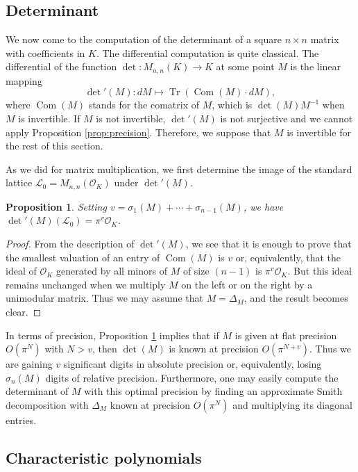 \documentclass{sig-alternate}
\DeclareMathOperator{\tr}{Tr}
\DeclareMathOperator{\com}{Com}
\newtheorem{prop}[theo]{Proposition}
\renewcommand{\O}{\mathcal O}
\newcommand{\detp}{\det{'}}
\begin{document}
\subsection{Determinant}

We now come to the computation of the determinant of a square $n 
\times n$ matrix with coefficients in $K$. The differential computation is 
quite classical.  The differential of the function $\det : M_{n,n}(K) \to 
K$ at some point $M$ is the linear mapping
$$\detp(M) : dM \mapsto \tr(\com(M) \cdot dM),$$
where $\com(M)$ stands for the comatrix of $M$, which is $\det(M) M^{-1}$ when $M$ is invertible. If $M$ is not 
invertible, $\detp(M)$ is not surjective and we cannot apply Proposition 
\ref{prop:precision}. Therefore, we suppose that $M$ is invertible for the rest of this section.

As we did for matrix multiplication, we first determine the image of
the standard lattice $\mathcal L_0 = M_{n,n}(\O_K)$ under $\detp(M)$.

\begin{prop}
\label{prop:detmatrix}
Setting $v = \sigma_1(M) + \cdots + \sigma_{n-1}(M)$, we have
$\detp(M)(\mathcal L_0) = \pi^v \O_K$.
\end{prop}

\begin{proof}
From the description of $\detp(M)$, we see that it is enough to prove 
that the smallest valuation of an entry of $\com(M)$ is $v$
or, equivalently, that the ideal of $\O_K$ generated by all 
minors of $M$ of size $(n-1)$ is $\pi^v
\O_K$. But this ideal remains unchanged when we multiply $M$ 
on the left or on the right by a unimodular matrix. Thus we may 
assume that $M = \Delta_M$, and the result becomes clear.
\end{proof}

In terms of precision, Proposition \ref{prop:detmatrix} implies that if 
$M$ is given at flat precision $O(\pi^N)$ with $N > v$, then $\det(M)$ 
is known at precision $O(\pi^{N+v})$.  Thus we are gaining $v$ significant 
digits in absolute precision or, equivalently, losing $\sigma_n(M)$ digits
of relative precision.
Furthermore, one may easily compute the determinant
of $M$ with this optimal precision by finding an approximate
Smith decomposition with $\Delta_M$ known at precision $O(\pi^N)$ and
multiplying its diagonal entries. 

\subsection{Characteristic polynomials} \label{ssec:charpoly}
\end{document}
